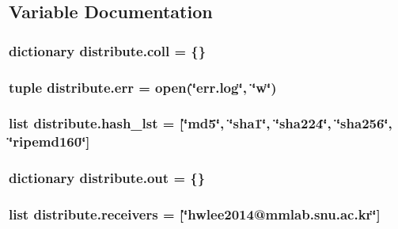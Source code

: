 \subsection{Variable Documentation}
\hypertarget{namespacedistribute_a8415b42a9f6c94b948983c90918e75a2}{
\subsubsection[{coll}]{\setlength{\rightskip}{0pt plus 5cm}dictionary distribute.\-coll = \{\}}}\label{namespacedistribute_a8415b42a9f6c94b948983c90918e75a2}
\hypertarget{namespacedistribute_a9cb137df933cf742770fc5f96504190e}{
\subsubsection[{err}]{\setlength{\rightskip}{0pt plus 5cm}tuple distribute.\-err = open(\char`\"{}err.\-log\char`\"{}, \char`\"{}w\char`\"{})}}\label{namespacedistribute_a9cb137df933cf742770fc5f96504190e}
\hypertarget{namespacedistribute_ad7ab67bcd426b40cd157285e243cf831}{
\subsubsection[{hash\-\_\-lst}]{\setlength{\rightskip}{0pt plus 5cm}list distribute.\-hash\-\_\-lst = \mbox{[}\char`\"{}md5\char`\"{}, \char`\"{}sha1\char`\"{}, \char`\"{}sha224\char`\"{}, \char`\"{}sha256\char`\"{}, \char`\"{}ripemd160\char`\"{}\mbox{]}}}\label{namespacedistribute_ad7ab67bcd426b40cd157285e243cf831}
\hypertarget{namespacedistribute_a18a9f9bdb4fbe8e39a3d6e2d6fa7854e}{
\subsubsection[{out}]{\setlength{\rightskip}{0pt plus 5cm}dictionary distribute.\-out = \{\}}}\label{namespacedistribute_a18a9f9bdb4fbe8e39a3d6e2d6fa7854e}
\hypertarget{namespacedistribute_aa94e38b30b74ed3c56dc343fc6ab4e04}{
\subsubsection[{receivers}]{\setlength{\rightskip}{0pt plus 5cm}list distribute.\-receivers = \mbox{[}\char`\"{}hwlee2014@mmlab.\-snu.\-ac.\-kr\char`\"{}\mbox{]}}}\label{namespacedistribute_aa94e38b30b74ed3c56dc343fc6ab4e04}
